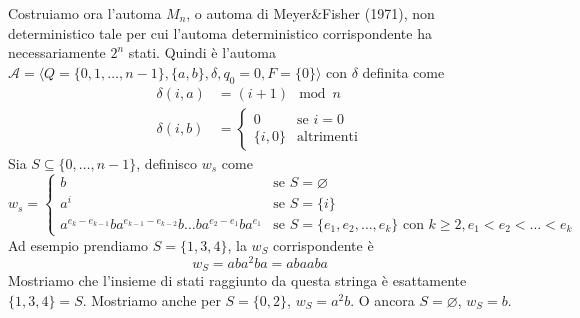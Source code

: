 \documentclass[12pt]{report}
\begin{document}
	Costruiamo ora l'automa $M_n$, o automa di Meyer\&Fisher (1971), non deterministico tale per cui l'automa deterministico corrispondente ha necessariamente $2^n$ stati.
	Quindi è l'automa $\mathcal{A} = \langle Q = \{0, 1, \dots, n - 1\}, \{a, b \}, \delta, q_0 = 0, F = \{ 0 \} \rangle$ con $\delta$ definita come
	\begin{align*}
		\delta(i, a) &= (i + 1) \mod n \\
		\delta(i, b) &= \begin{cases} 0 	& \text{se } i = 0 \\ \{i, 0\} & \text{altrimenti} \end{cases}
	\end{align*}
	Sia $S \subseteq \{0, \dots, n - 1 \}$, definisco $w_s$ come
	$$ w_s = \begin{cases} b & \text{se } S = \varnothing \\ a^i & \text{se } S = \{ i \} \\ a^{e_k - e_{k - 1}}ba^{e_{k - 1} - e_{k - 2}}b\dots ba^{e_2 - e_1}ba^{e_1} & \text{se } S = \{e_1, e_2, \dots, e_k \} \text{ con } k \geq 2, e_1 < e_2 < \dots < e_k \end{cases} $$
	Ad esempio prendiamo $S = \{1, 3, 4\}$, la $w_S$ corrispondente è
	$$w_S = aba^2ba = abaaba $$
	Mostriamo che l'insieme di stati raggiunto da questa stringa è esattamente $\{1, 3, 4\} = S$.
	Mostriamo anche per $S = \{0, 2\}$, $w_S = a^2b$.
	O ancora $S = \varnothing$, $w_S = b$.
\end{document}

